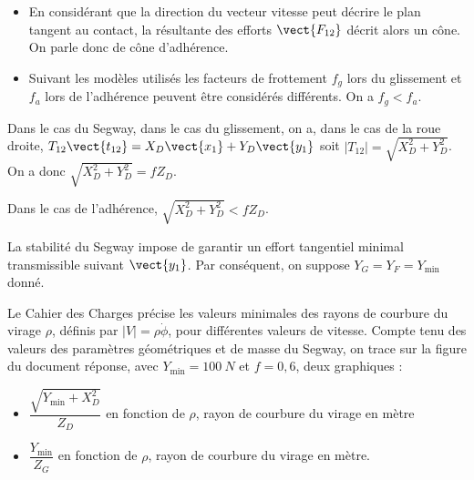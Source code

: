 \begin{corrige}
\begin{rem}
\begin{itemize}
\item En considérant que la direction du vecteur vitesse peut décrire le plan tangent au contact, la résultante des efforts $\vect{F_{12}}$ décrit alors un cône. On parle donc de cône d'adhérence. 
\item Suivant les modèles utilisés les facteurs de frottement $f_g$ lors du glissement et $f_a$ lors de l'adhérence peuvent être considérés différents. On a $f_g<f_a$.
\end{itemize}
\end{rem}

Dans le cas du Segway, dans le cas du glissement, on a, dans le cas de la roue droite, $T_{12} \vect{t_{12}} = X_D\vect{x_1}+Y_D\vect{y_1} $ soit $|T_{12}| =\sqrt{X_D^2+Y_D^2}$. On a donc 
$\sqrt{X_D^2+Y_D^2} = f Z_D$. 

Dans le cas de l'adhérence, $\sqrt{X_D^2+Y_D^2} < f Z_D$.
\end{corrige}
\else
\fi

\ifprof
\else


La stabilité du Segway impose de garantir un effort tangentiel minimal transmissible suivant $\vect{y_1}$. Par conséquent, on suppose  $Y_G = Y_F=Y_{\text{min}}$ donné. 

Le Cahier des Charges précise les valeurs minimales des rayons de courbure du virage $\rho$, définis par $|V|=\rho\dot{\phi}$, pour différentes valeurs de vitesse. Compte tenu des valeurs des paramètres géométriques et de masse du Segway, on trace sur la figure du document réponse, avec $Y_{\text{min}}=\SI{100}{N}$ et $f=0,6$, deux graphiques :
\begin{itemize}
\item  $\dfrac{\sqrt{Y_{\text{min}}+X_D^2}}{Z_D}$ en fonction de $\rho$, rayon de courbure du virage en mètre
\item  $\dfrac{Y_{\text{min}}}{Z_G}$ en fonction de $\rho$, rayon de courbure du virage en mètre.
\end{itemize}

\fi


